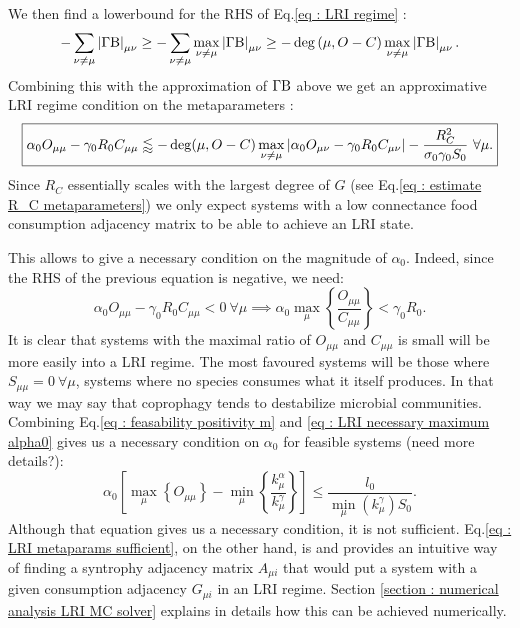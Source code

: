 \documentclass[12pt, titlepage]{report}
\begin{document}
We then find a lowerbound for the RHS of Eq.\eqref{eq : LRI regime} :
\begin{equation}
-\sum_{\nu\neq\mu}\left|{\Gamma\text{B}}\right|_{\mu\nu} \geq - \sum_{\nu \neq \mu} \max_{\nu \neq \mu} \left|{\Gamma\text{B}}\right|_{\mu\nu} \geq - \deg\left(\mu, O-C \right) \max_{\nu \neq \mu} \left|{\Gamma\text{B}}\right|_{\mu\nu}.
\end{equation}
Combining this with the approximation of $\Gamma\text{B}$ above we get an approximative LRI regime condition on the metaparameters :
\begin{equation}\boxed{
\alpha_0 O_{\mu \mu}-\gamma_0R_0 C_{\mu\mu} \lessapprox - \deg(\mu, O-C) \max_{\nu\neq\mu}\left|{\alpha_0 O_{\mu \nu}-\gamma_0 R_0 C_{\mu\nu}}\right|-\frac{R_C^2}{\sigma_0\gamma_0 S_0} \ \forall \mu.
}\label{eq : LRI metaparams sufficient}
\end{equation}
Since $R_C$ essentially scales with the largest degree of $G$ (see Eq.\ref{eq : estimate R_C metaparameters}) we only expect systems with a low connectance food consumption adjacency matrix to be able to achieve an LRI state.

This allows to give a necessary condition on the magnitude of $\alpha_0$. Indeed, since the RHS of the previous equation is negative, we need:
\begin{equation}
\alpha_0 O_{\mu \mu}-\gamma_0 R_0 C_{\mu\mu} < 0 \ \forall \mu \implies {\alpha_0 \max_\mu \left\{ \frac{O_{\mu\mu}}{C_{\mu\mu}}  \right\} < \gamma_0 R_0 .} \label{eq : LRI necessary maximum alpha0}
\end{equation}
It is clear that systems with the maximal ratio of $O_{\mu\mu}$ and $C_{\mu\mu}$ is small will be more easily into a LRI regime. The most favoured systems will be those where $S_{\mu\mu}=0 \ \forall \mu$, \ie systems where no species consumes what it itself produces. In that way we may say that coprophagy tends to destabilize microbial communities.
Combining Eq.\eqref{eq : feasability positivity m} and \eqref{eq : LRI necessary maximum alpha0} gives us a necessary condition on $\alpha_0$ for feasible systems (need more details?):
\begin{equation}
\boxed{
\alpha_0 \left[\max_\mu \left\{O_{\mu\mu}\right\}-\min_\mu \left\{ \frac{k^\alpha_\mu}{k^\gamma_\mu} \right\} \right] \leq \frac{l_0}{\min_\mu\left(k_\mu^\gamma\right)S_0}}.
\end{equation}
Although that equation gives us a necessary condition, it is not sufficient. Eq.\eqref{eq : LRI metaparams sufficient}, on the other hand, is and provides an intuitive way of finding a syntrophy adjacency matrix $A_{\mu i}$ that would put a system with a given consumption adjacency $G_{\mu i}$ in an LRI regime. Section \ref{section : numerical analysis LRI MC solver} explains in details how this can be achieved numerically.
\end{document}
